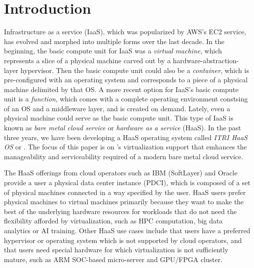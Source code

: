 \section{Introduction}


Infrastructure as a service (IaaS), which was popularized by AWS's EC2 service, has evolved and morphed into multiple forms over the last decade.
In the beginning, the basic compute unit for IaaS was a {\em virtual machine}, which represents a slice of a physical machine carved out by a hardware-abstraction-layer hypervisor.
Then the basic compute unit could also be a {\em container}, which is pre-configured with an operating system and corresponds to a piece of a physical machine delimited by that OS.
A more recent option for IaaS's basic compute unit is a {\em function}, which comes with a complete operating environment constsing of an OS and a middleware layer, and is created on demand.  
Lately, even a physical machine could serve as the basic compute unit. This type of IaaS is known as {\em bare metal cloud service} or {\em hardware as a service} (HaaS). In the past three years, we have been developing a HaaS operating system called {\em ITRI HaaS OS} or \sna.  
The focus of this paper is on \sna's virtualization support that emhances the manageability and serviceability required of a modern bare metal cloud service. 

The HaaS offerings from cloud operators such as IBM (SoftLayer) and Oracle provide a user a physical data center instance (PDCI), which is composed of a set of physical machines connected in a way specified by the user. HaaS users prefer physical machines to virtual machines primarily because they want to make the best of the underlying hardware resources for workloads that do not need the flexibility afforded by virtualization, such as HPC computation, big data analytics or AI training.
Other HaaS use cases include that users have a preferred hypervisor or operating system which is not supported by cloud operators, and 
that users need special hardware for which virtualization is not sufficiently mature, such as ARM SOC-based micro-server and GPU/FPGA cluster.

